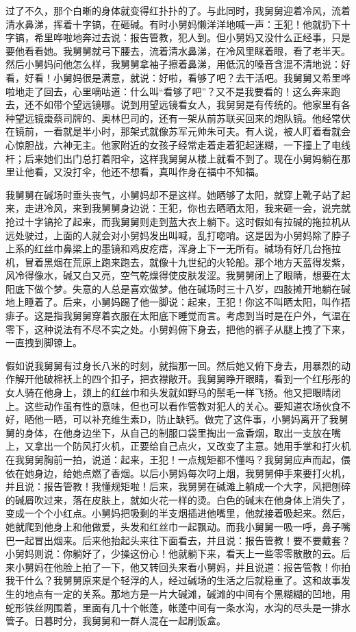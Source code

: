 过了不久，那个白晰的身体就变得红扑扑的了。与此同时，我舅舅迎着冷风，流着清水鼻涕，挥着十字镐，在砸碱。有时小舅妈懒洋洋地喊一声：王犯！他就扔下十字镐，希里哗啦地奔过去说：报告管教，犯人到。但小舅妈又没什么正经事，只是要他看看她。我舅舅就弓下腰去，流着清水鼻涕，在冷风里眯着眼，看了老半天。然后小舅妈问他怎么样，我舅舅拿袖子擦着鼻涕，用低沉的嗓音含混不清地说：好看，好看！小舅妈很是满意，就说：好啦，看够了吧？去干活吧。我舅舅又希里哗啦地走了回去，心里嘀咕道：什么叫“看够了吧”？又不是我要看的！这么奔来跑去，还不如带个望远镜哪。说到用望远镜看女人，我舅舅是有传统的。他家里有各种望远镜棗蔡司牌的、奥林巴司的，还有一架从前苏联买回来的炮队镜。他经常伏在镜前，一看就是半小时，那架式就像苏军元帅朱可夫。有人说，被人盯着看就会心惊胆战，六神无主。他家附近的女孩子经常走着走着犯起迷糊，一下撞上了电线杆；后来她们出门总打着阳伞，这样我舅舅从楼上就看不到了。现在小舅妈躺在那里让他看，又没打伞，他还不想看，真叫作身在福中不知福。 

我舅舅在碱场时垂头丧气，小舅妈却不是这样。她晒够了太阳，就穿上靴子站了起来，走进冷风，来到我舅舅身边说：王犯，你也去晒晒太阳，我来砸一会，说完就抢过十字镐抡了起来，而我舅舅则走到蓝大衣上躺下。这时假如有拉碱的拖拉机从远处驶过，上面的人就会对小舅妈发出叫喊，乱打唿哨。这是因为小舅妈除了脖子上系的红丝巾鼻梁上的墨镜和鸡皮疙瘩，浑身上下一无所有。碱场有好几台拖拉机，冒着黑烟在荒原上跑来跑去，就像十九世纪的火轮船。那个地方天蓝得发紫，风冷得像水，碱又白又亮，空气乾燥得使皮肤发涩。我舅舅闭上了眼睛，想要在太阳底下做个梦。失意的人总是喜欢做梦。他在碱场时三十八岁，四肢摊开地躺在碱地上睡着了。后来，小舅妈踢了他一脚说：起来，王犯！你这不叫晒太阳，叫作捂痱子。这是指我舅舅穿着衣服在太阳底下睡觉而言。考虑到当时是在户外，气温在零下，这种说法有不尽不实之处。小舅妈俯下身去，把他的裤子从腿上拽了下来，一直拽到脚镣上。 

假如说我舅舅有过身长八米的时刻，就指那一回。然后她又俯下身去，用暴烈的动作解开他破棉袄上的四个扣子，把衣襟敞开。我舅舅睁开眼睛，看到一个红彤彤的女人骑在他身上，颈上的红丝巾和头发就如野马的鬃毛一样飞扬。他又把眼睛闭上。这些动作虽有性的意味，但也可以看作管教对犯人的关心。要知道农场伙食不好，晒他一晒，可以补充维生素D，防止缺钙。做完了这件事，小舅妈离开了我舅舅的身体，在他身边坐下，从自己的制服口袋里掏出一盒香烟，取出一支放在嘴上，又拿出一个防风打火机，正要给自己点火，又改变了主意。她用手掌和打火机在我舅舅胸前一拍，说道：起来，王犯！一点规矩都不懂吗？我舅舅应声而起，偎依在她身边，给她点燃了香烟。以后小舅妈每次叼上烟，我舅舅伸手来要打火机，并且说：报告管教！我懂规矩啦！后来，我舅舅在碱滩上躺成一个大字，风把刨碎的碱屑吹过来，落在皮肤上，就如火花一样的烫。白色的碱末在他身体上消失了，变成一个个小红点。小舅妈把吸剩的半支烟插进他嘴里，他就接着吸起来。然后，她就爬到他身上和他做爱，头发和红丝巾一起飘动。而我小舅舅一吸一呼，鼻子嘴巴一起冒出烟来。后来他抬起头来往下面看去，并且说：报告管教！要不要戴套？小舅妈则说：你躺好了，少操这份心！他就躺下来，看天上一些零零散散的云。后来小舅妈在他脸上拍了一下，他又转回头来看小舅妈，并且说道：报告管教！你拍我干什么？我舅舅原来是个轻浮的人，经过碱场的生活之后就稳重了。这和故事发生的地点有一定的关系。那地方是一片大碱滩，碱滩的中间有个黑糊糊的凹地，用蛇形铁丝网围着，里面有几十个帐蓬，帐蓬中间有一条水沟，水沟的尽头是一排水管子。日暮时分，我舅舅和一群人混在一起刷饭盒。 

